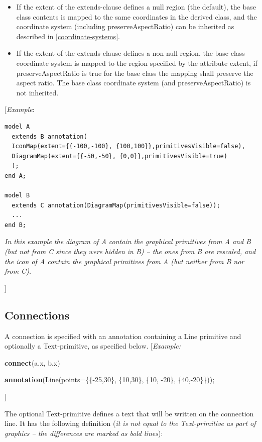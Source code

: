 \documentclass[10pt,a4paper]{report}
\def\doublelabel#1{\label{#1}\hypertarget{#1}{}}
\begin{document}
\begin{itemize}
\item
  If the extent of the extends-clause defines a null region (the
  default), the base class contents is mapped to the same coordinates in
  the derived class, and the coordinate system (including
  preserveAspectRatio) can be inherited as described in 
  \ref{coordinate-systems}.
\item
  If the extent of the extends-clause defines a non-null region, the
  base class coordinate system is mapped to the region specified by the
  attribute extent, if preserveAspectRatio is true for the base class
  the mapping shall preserve the aspect ratio. The base class coordinate
  system (and preserveAspectRatio) is not inherited.
\end{itemize}

{[}\emph{Example}:

\begin{lstlisting}[language=modelica]
model A
  extends B annotation(
  IconMap(extent={{-100,-100}, {100,100}},primitivesVisible=false),
  DiagramMap(extent={{-50,-50}, {0,0}},primitivesVisible=true)
  );
end A;

model B
  extends C annotation(DiagramMap(primitivesVisible=false));
  ...
end B;
\end{lstlisting}
\emph{In this example the diagram of A contain the graphical primitives
from A and B (but not from C since they were hidden in B) -- the ones
from B are rescaled, and the icon of A contain the graphical primitives
from A (but neither from B nor from C).}

{]}

\subsection{Connections}\doublelabel{connections1}

A connection is specified with an annotation containing a Line primitive
and optionally a Text-primitive, as specified below. {[}\emph{Example:}

\textbf{connect}(a.x, b.x)

\textbf{annotation}(Line(points=\{\{-25,30\}, \{10,30\}, \{10, -20\},
\{40,-20\}\}));

{]}

The optional Text-primitive defines a text that will be written on the
connection line. It has the following definition (\emph{it is not equal
to the Text-primitive as part of graphics -- the differences are marked
as bold lines}):
\end{document}
